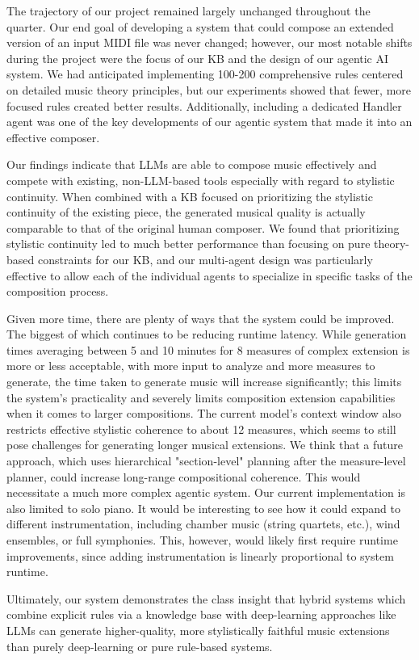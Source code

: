 \documentclass[conference]{IEEEtran}
\begin{document}
The trajectory of our project remained largely unchanged throughout the quarter. Our end goal of developing a system that could compose an extended version of an input MIDI file was never changed; however, our most notable shifts during the project were the focus of our KB and the design of our agentic AI system. We had anticipated implementing 100-200 comprehensive rules centered on detailed music theory principles, but our experiments showed that fewer, more focused rules created better results. Additionally, including a dedicated Handler agent was one of the key developments of our agentic system that made it into an effective composer. 

Our findings indicate that LLMs are able to compose music effectively and compete with existing, non-LLM-based tools especially with regard to stylistic continuity. When combined with a KB focused on prioritizing the stylistic continuity of the existing piece, the generated musical quality is actually comparable to that of the original human composer. We found that prioritizing stylistic continuity led to much better performance than focusing on pure theory-based constraints for our KB, and our multi-agent design was particularly effective to allow each of the individual agents to specialize in specific tasks of the composition process. 

Given more time, there are plenty of ways that the system could be improved. The biggest of which continues to be reducing runtime latency. While generation times averaging between 5 and 10 minutes for 8 measures of complex extension is more or less acceptable, with more input to analyze and more measures to generate, the time taken to generate music will increase significantly; this limits the system's practicality and severely limits composition extension capabilities when it comes to larger compositions. The current model's context window also restricts effective stylistic coherence to about 12 measures, which seems to still pose challenges for generating longer musical extensions. We think that a future approach, which uses hierarchical "section-level" planning after the measure-level planner, could increase long-range compositional coherence. This would necessitate a much more complex agentic system. Our current implementation is also limited to solo piano. It would be interesting to see how it could expand to different instrumentation, including chamber music (string quartets, etc.), wind ensembles, or full symphonies. This, however, would likely first require runtime improvements, since adding instrumentation is linearly proportional to system runtime. 

Ultimately, our system demonstrates the class insight that hybrid systems which combine explicit rules via a knowledge base with deep-learning approaches like LLMs can generate higher-quality, more stylistically faithful music extensions than purely deep-learning or pure rule-based systems. 




\end{document}
